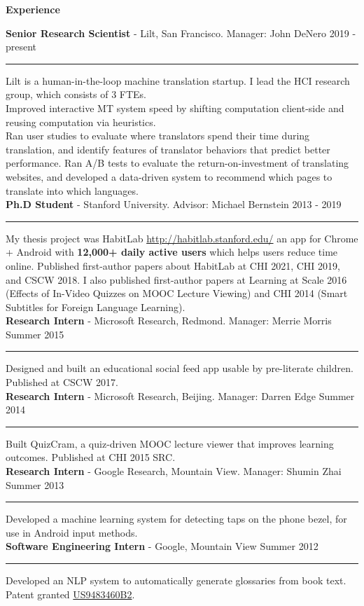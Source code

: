 \documentclass[10pt,A4]{article}
\newcommand{\cvsection}[1]
{
	\begin{center}
		\large\textcolor{sectcol}{\textbf{#1}}
	\end{center}
}
\newcommand{\cvevtzero}[4]
{

	\textbf{#2} - \textcolor{bgcol}{#3} \hfill \vspace{2.5pt}\textcolor{sectcol}{#1}

\vspace{-8pt}
\textcolor{softcol}{\hrule}
\vspace{6pt}

}
\newcommand{\cvevtone}[4]
{

	\textbf{#2} - \textcolor{bgcol}{#3} \hfill \vspace{2.5pt}\textcolor{sectcol}{#1}

\vspace{-8pt}
\textcolor{softcol}{\hrule}
\vspace{6pt}

  #4\\[3pt]

}
\begin{document}
\cvsection{Experience}

\cvevtzero{2019 - present}{Senior Research Scientist}{Lilt, San Francisco. Manager: John DeNero}\\
Lilt is a human-in-the-loop machine translation startup. I lead the HCI research group, which consists of 3 FTEs.\\
Improved interactive MT system speed by shifting computation client-side and reusing computation via heuristics.\\
Ran user studies to evaluate where translators spend their time during translation, and identify features of translator behaviors that predict better performance. Ran A/B tests to evaluate the return-on-investment of translating websites, and developed a data-driven system to recommend which pages to translate into which languages.\\

\cvevtzero{2013 - 2019}{Ph.D Student}{Stanford University. Advisor: Michael Bernstein}\\
My thesis project was HabitLab \url{http://habitlab.stanford.edu/} an app for Chrome + Android with \textbf{12,000+ daily active users} which helps users reduce time online. Published first-author papers about HabitLab at CHI 2021, CHI 2019, and CSCW 2018. I also published first-author papers at Learning at Scale 2016 (Effects of In-Video Quizzes on MOOC Lecture Viewing) and CHI 2014 (Smart Subtitles for Foreign Language Learning).\\ %

%
\cvevtone{Summer 2015}{Research Intern}{Microsoft Research, Redmond. Manager: Merrie Morris}{Designed and built an educational social feed app usable by pre-literate children. Published at CSCW 2017.}

\cvevtone{Summer 2014}{Research Intern}{Microsoft Research, Beijing. Manager: Darren Edge}{Built QuizCram, a quiz-driven MOOC lecture viewer that improves learning outcomes. Published at CHI 2015 SRC.}

\cvevtone{Summer 2013}{Research Intern}{Google Research, Mountain View. Manager: Shumin Zhai}{Developed a machine learning system for detecting taps on the phone bezel, for use in Android input methods.}

\cvevtone{Summer 2012}{Software Engineering Intern}{Google, Mountain View}{Developed an NLP system to automatically generate glossaries from book text. Patent granted \href{https://patents.google.com/patent/US9483460B2}{US9483460B2}.}
\end{document}
